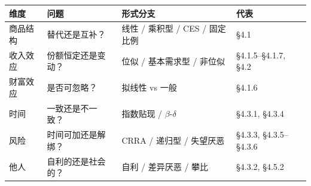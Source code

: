 \begin{center}
\small
\begin{tabular}{llll}
\toprule
维度 & 问题 & 形式分支 & 代表 \\
\midrule
商品结构 & 替代还是互补？ & 线性 / 乘积型 / CES / 固定比例 & §4.1 \\
收入效应 & 份额恒定还是变动？ & 位似 / 基本需求型 / 非位似 & §4.1.5--§4.1.7, §4.2 \\
财富效应 & 是否可忽略？ & 拟线性 vs 一般 & §4.1.6 \\
时间 & 一致还是不一致？ & 指数贴现 / $\beta$-$\delta$ & §4.3.1, §4.3.4 \\
风险 & 时间可加还是解绑？ & CRRA / 递归型 / 失望厌恶 & §4.3.3, §4.3.5--§4.3.6 \\
他人 & 自利的还是社会的？ & 自利 / 差异厌恶 / 攀比 & §4.3.2, §4.5.2 \\
\bottomrule
\end{tabular}
\end{center}
